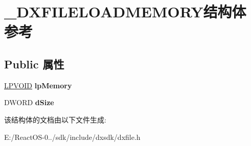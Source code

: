 \hypertarget{struct___d_x_f_i_l_e_l_o_a_d_m_e_m_o_r_y}{}\section{\+\_\+\+D\+X\+F\+I\+L\+E\+L\+O\+A\+D\+M\+E\+M\+O\+R\+Y结构体 参考}
\label{struct___d_x_f_i_l_e_l_o_a_d_m_e_m_o_r_y}
\subsection*{Public 属性}
\begin{DoxyCompactItemize}
\item 
\mbox{\label{struct___d_x_f_i_l_e_l_o_a_d_m_e_m_o_r_y_a381e80744d03d815aa9c4397823caad4}} 
\hyperlink{interfacevoid}{L\+P\+V\+O\+ID} {\bfseries lp\+Memory}
\item 
\mbox{\label{struct___d_x_f_i_l_e_l_o_a_d_m_e_m_o_r_y_aac5d637a8537e17d5cdab6501e6ad8f4}} 
D\+W\+O\+RD {\bfseries d\+Size}
\end{DoxyCompactItemize}


该结构体的文档由以下文件生成\+:\begin{DoxyCompactItemize}
\item 
E\+:/\+React\+O\+S-\/0../sdk/include/dxsdk/dxfile.\+h\end{DoxyCompactItemize}
